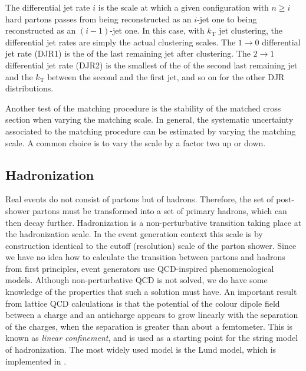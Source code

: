 The differential jet rate $i$ is the scale at which a given configuration with $n\geq i$ hard
partons passes from being reconstructed as an $i$-jet one to being reconstructed as an $(i − 1)$-jet
one. 
In this case, with $k_\mathrm{T}$ jet clustering, the differential jet rates are simply the actual
clustering scales. The $1\rightarrow 0$ differential jet rate (DJR1) is the \pt of the last
remaining jet after clustering. The $2\rightarrow 1$ differential jet rate (DJR2) is the smallest of
the \pt of the second last remaining jet and the $k_\mathrm{T}$ between the second and the first
jet, and so on for the other DJR distributions.

Another test of the matching procedure is the stability of the matched cross section when varying
the matching scale. In general, the systematic uncertainty associated to the matching procedure can
be estimated by varying the matching scale. A common choice is to vary the scale by a factor two up
or down. 


\subsection{Hadronization \label{sec:event_hadronization}}

Real events do not consist of partons but of hadrons. Therefore, the set of post-shower partons
must be transformed into a set of primary hadrons, which can then decay further. 
Hadronization is a non-perturbative transition taking place at the hadronization scale. In the
event generation context this scale is by construction identical to the cutoff (resolution) scale of
the parton shower.
Since we have no idea how to calculate the transition between partons and hadrons from first
principles, event generators use QCD-inspired phenomenological models.
Although non-perturbative QCD is not solved, we do have some knowledge of the properties
that such a solution must have. 
An important result from lattice QCD calculations is that the potential of the colour dipole field
between a charge and an anticharge appears to grow linearly with the separation of the charges, when
the separation is greater than about a femtometer. This is known as \textit{linear confinement}, and
is used as a starting point for the string model of hadronization.
The most widely used model is the Lund model, which is implemented in \PYTHIA.


